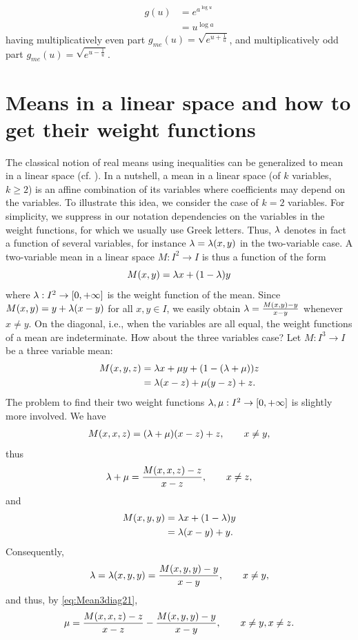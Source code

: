 \documentclass{amsart}
\makeatletter
\theoremstyle{plain}
\numberwithin{equation}{section}
\def\lambda{\Greekmath 0115 }%
\def\mu{\Greekmath 0116 }%
\def\FindBoldGroup{%
   {\setbox0=\hbox{$\mathbf{x\global\edef\theboldgroup{\the\mathgroup}}$}}%
}
\def\Greekmath#1#2#3#4{%
    \if@compatibility
        \ifnum\mathgroup=\symbold
           \mathchoice{\mbox{\boldmath$\displaystyle\mathchar"#1#2#3#4$}}%
                      {\mbox{\boldmath$\textstyle\mathchar"#1#2#3#4$}}%
                      {\mbox{\boldmath$\scriptstyle\mathchar"#1#2#3#4$}}%
                      {\mbox{\boldmath$\scriptscriptstyle\mathchar"#1#2#3#4$}}%
        \else
           \mathchar"#1#2#3#4%
        \fi 
    \else 
        \FindBoldGroup
        \ifnum\mathgroup=\theboldgroup %
           \mathchoice{\mbox{\boldmath$\displaystyle\mathchar"#1#2#3#4$}}%
                      {\mbox{\boldmath$\textstyle\mathchar"#1#2#3#4$}}%
                      {\mbox{\boldmath$\scriptstyle\mathchar"#1#2#3#4$}}%
                      {\mbox{\boldmath$\scriptscriptstyle\mathchar"#1#2#3#4$}}%
        \else
           \mathchar"#1#2#3#4%
        \fi     	    
	  \fi}
\makeatother
\begin{document}
\begin{eqnarray*}
g(u)&= e^{a^{\log{u}}}\\
&= u^{\log{a}}
\end{eqnarray*}
having multiplicatively even part
$g_{me}(u)=\sqrt{e^{u+\frac{1}{u}}}$,
and multiplicatively odd part
$g_{me}(u)=\sqrt{e^{u-\frac{1}{u}}}$.


\section{Means in a linear space and how to get their weight functions}
The classical notion of real means using inequalities can be generalized to mean in a linear space 
(cf. \cite{PalMer2018}).
In a nutshell, a mean in a linear space (of $k$ variables, $k \geq 2$) is an affine combination of its variables where coefficients may depend on the variables.
%
To illustrate this idea, we consider the case of $k=2$ variables. 
For simplicity, we suppress in our notation dependencies on the variables in the weight functions, for which we usually use Greek letters.
Thus, $\lambda$ denotes in fact a function of several variables, for instance $\lambda=\lambda (x,y)$ in the two-variable case.
A two-variable mean in a linear space $M: I^2 \to I$ is thus a function of the form
\begin{equation*}
M(x,y)= \lambda x + (1-\lambda)y
\end{equation*}
where $\lambda: I^2 \to [0, + \infty]$ is the weight function of the mean.
Since $M(x,y)=y + \lambda (x-y)$ for all $x,y \in I$, 
we easily obtain $\lambda=\frac{M(x,y)-y}{x-y}$ whenever $x \neq y$.
{On the diagonal, i.e., when the variables are all equal, the weight functions of a mean are indeterminate.}
How about the three variables case? 
Let $M: I^3 \to I$ be a three variable mean:
\begin{eqnarray*}
	M(x,y,z) &= \lambda x + \mu y + (1-(\lambda+\mu))z\\
	&=
	\lambda (x-z) + \mu (y-z) +z.
\end{eqnarray*} 
The problem to find their two weight functions $\lambda, \mu: I^2 \to [0, +\infty]$ is slightly more involved.
We have
\begin{align}
	M(x,x,z)= (\lambda+\mu) (x-z)  + z,\qquad { x \neq y},
	\label{eq:Mean3diag21}
\end{align}
thus
\begin{equation}
	\lambda+\mu=\frac{M(x,x,z)-z }{x-z}, \qquad x \neq z,
	\label{eq:Mean3diag21}
\end{equation}
and
\begin{eqnarray*}
	M(x,y,y) &= \lambda x + (1-\lambda) y\\
	&=
	\lambda (x-y) +y.
\end{eqnarray*}
Consequently, 
\begin{equation*}
	\lambda=\lambda(x,y,y)=\frac{M(x,y,y)-y}{x-y}, \qquad x \neq y,
\end{equation*}
and thus, by \eqref{eq:Mean3diag21},
\begin{equation*}
	\mu =
	\frac{M(x,x,z)-z}{x-z}-\frac{M(x,y,y)-y}{x-y}, \qquad x \neq y, x \neq z.
\end{equation*}
\end{document}
